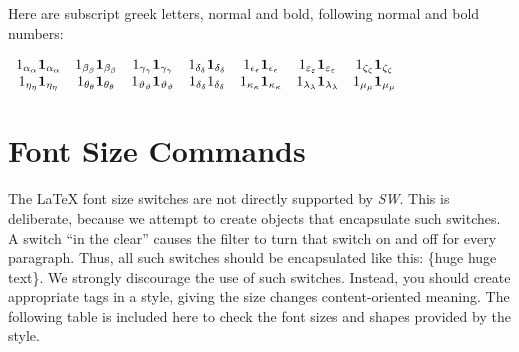 \documentclass{article}
\begin{document}
Here are subscript greek letters, normal and bold, following normal and bold
numbers:

$%
\begin{array}{ccccccc}
1_{\alpha _{\alpha }}\mathbf{1}_{\mathbf{\alpha }_{\mathbf{\alpha }}} & 
1_{\beta _{\beta }}\mathbf{1}_{\mathbf{\beta }_{\mathbf{\beta }}} & 
1_{\gamma _{\gamma }}\mathbf{1}_{\mathbf{\gamma }_{\mathbf{\gamma }}} & 
1_{\delta _{\delta }}\mathbf{1}_{\mathbf{\delta }_{\mathbf{\delta }}} & 
1_{\epsilon _{\epsilon }}\mathbf{1}_{\mathbf{\epsilon }_{\epsilon }} & 
1_{\varepsilon _{\varepsilon }}\mathbf{1}_{\mathbf{\varepsilon }_{\mathbf{%
\varepsilon }}} & 1_{\zeta _{\zeta }}\mathbf{1}_{\mathbf{\zeta }_{\mathbf{%
\zeta }}} \\ 
1_{\eta _{\eta }}\mathbf{1}_{\mathbf{\eta }_{\mathbf{\eta }}} & 1_{\theta
_{\theta }}\mathbf{1}_{\mathbf{\theta }_{\mathbf{\theta }}} & 1_{\vartheta
_{\vartheta }}\mathbf{1}_{\mathbf{\vartheta }_{\mathbf{\vartheta }}} & 
1_{\delta _{\delta }}1_{\mathbf{\delta }_{\mathbf{\delta }}} & 1_{\kappa
_{\kappa }}\mathbf{1}_{\mathbf{\kappa }_{\mathbf{\kappa }}} & 1_{\lambda
_{\lambda }}\mathbf{1}_{\mathbf{\lambda }_{\mathbf{\lambda }}} & 1_{\mu
_{\mu }}\mathbf{1}_{\mathbf{\mu }_{\mathbf{\mu }}}%
\end{array}
$

\section{Font Size Commands}

The \LaTeX{} font size switches are not directly supported by \textsl{SW}.
This is deliberate, because we attempt to create objects that encapsulate
such switches. A switch ``in the clear'' causes the filter to turn that
switch on and off for every paragraph. Thus, all such switches should be
encapsulated like this: \{\TEXTsymbol{\backslash}huge huge text\}. We
strongly discourage the use of such switches. Instead, you should create
appropriate tags in a style, giving the size changes content-oriented
meaning. The following table is included here to check the font sizes and
shapes provided by the style.
\end{document}
